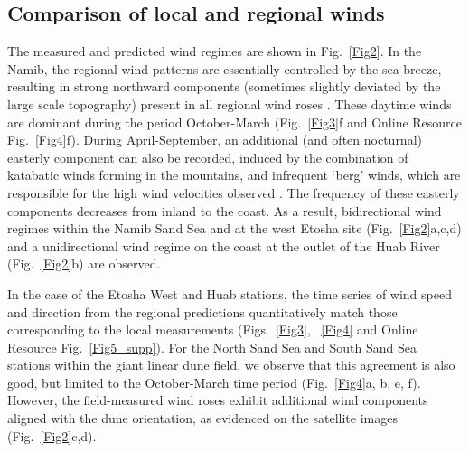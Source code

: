 \subsection{Comparison of local and regional winds}
\label{section_data_feedback}
The measured and predicted wind regimes are shown in Fig.~\ref{Fig2}. In the Namib, the regional wind patterns are essentially controlled by the sea breeze, resulting in strong northward components (sometimes slightly deviated by the large scale topography) present in all regional wind roses \citep{lancaster1985}. These daytime winds are dominant during the period October-March (Fig.~\ref{Fig3}f and Online Resource Fig.~\ref{Fig4}f). During April-September, an additional (and often nocturnal) easterly component can also be recorded, induced by the combination of katabatic winds forming in the mountains, and infrequent `berg' winds, which are responsible for the high wind velocities observed \citep{lancaster1984}. The frequency of these easterly components decreases from inland to the coast. As a result, bidirectional wind regimes within the Namib Sand Sea and at the west Etosha site (Fig.~\ref{Fig2}a,c,d) and a unidirectional wind regime on the coast at the outlet of the Huab River (Fig.~\ref{Fig2}b) are observed.

In the case of the Etosha West and Huab stations, the time series of wind speed and direction from the regional predictions quantitatively match those corresponding to the local measurements (Figs.~\ref{Fig3}, ~\ref{Fig4} and Online Resource Fig.~\ref{Fig5_supp}). For the North Sand Sea and South Sand Sea stations within the giant linear dune field, we observe that this agreement is also good, but limited to the October-March time period (Fig.~\ref{Fig4}a, b, e, f). However, the field-measured wind roses exhibit additional wind components aligned with the dune orientation, as evidenced on the satellite images (Fig.~\ref{Fig2}c,d).

